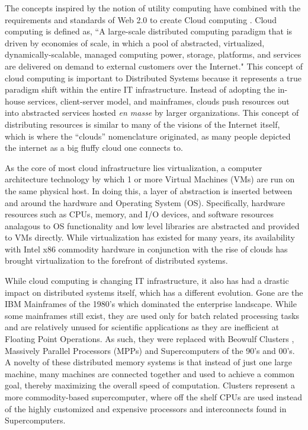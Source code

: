The concepts inspired by the notion of utility computing have combined with the requirements and standards of Web 2.0 \cite{alexander2006wnw} to create Cloud computing \cite{buyya2008moc, foster2008cca, aboveTheClouds}.  Cloud computing is defined as, ``A large-scale distributed computing paradigm that is driven by economies of scale, in which a pool of abstracted, virtualized, dynamically-scalable, managed computing power, storage, platforms, and services are delivered on demand to external customers over the Internet." This concept of cloud computing is important to Distributed Systems because it represents a true paradigm shift \cite{kuhn1970structure} within the entire IT infrastructure.  Instead of adopting the in-house services, client-server model, and mainframes, clouds push resources out into abstracted services hosted \textit{en masse} by larger organizations.  This concept of distributing resources is similar to many of the visions of the Internet itself, which is where the ``clouds'' nomenclature originated, as many people depicted the internet as a big fluffy cloud one connects to.

As the core of most cloud infrastructure lies virtualization, a computer architecture technology by which 1 or more Virtual Machines (VMs) are run on the same physical host. In doing this, a layer of abstraction is inserted between and around the hardware and Operating System (OS). Specifically, hardware resources such as CPUs, memory, and I/O devices, and software resources analagous to OS functionality and low level libraries are abstracted and provided to VMs directly. While virtualization has existed for many years,  its availability with Intel x86 commodity hardware in conjunction with the rise of clouds has brought virtualization to the forefront of distributed systems. 

While cloud computing is changing IT infrastructure, it also has had a drastic impact on distributed systems itself, which has a different evolution. Gone are the IBM Mainframes of the 1980's which dominated the enterprise landscape.  While some mainframes still exist, they are used only for batch related processing tasks and are relatively unused for scientific applications as they are inefficient at Floating Point Operations.  As such, they were replaced with Beowulf Clusters \cite{sterling2001beowulf}, Massively Parallel Processors (MPPs) and Supercomputers of the 90's and 00's. A novelty of these distributed memory systems is that instead of just one large machine, many machines are connected together and used to achieve a common goal, thereby maximizing the overall speed of computation.  Clusters represent a more commodity-based supercomputer, where off the shelf CPUs are used instead of the highly customized and expensive processors and interconnects found in Supercomputers.  

